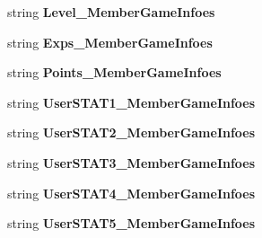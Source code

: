 \begin{DoxyCompactItemize}
\item 
string {\bfseries Level\+\_\+\+Member\+Game\+Infoes}\hypertarget{a00101_a8d192d2682e16ae259cc4486fe7c6ee0}{}\label{a00101_a8d192d2682e16ae259cc4486fe7c6ee0}

\item 
string {\bfseries Exps\+\_\+\+Member\+Game\+Infoes}\hypertarget{a00101_a2fe6ddf92bf865a907417ce0271d56ba}{}\label{a00101_a2fe6ddf92bf865a907417ce0271d56ba}

\item 
string {\bfseries Points\+\_\+\+Member\+Game\+Infoes}\hypertarget{a00101_a616c5e2aa7b237a1312c8d71a88f5f60}{}\label{a00101_a616c5e2aa7b237a1312c8d71a88f5f60}

\item 
string {\bfseries User\+S\+T\+A\+T1\+\_\+\+Member\+Game\+Infoes}\hypertarget{a00101_a1d41a8d2eada36ea6d6b5d16a7959c15}{}\label{a00101_a1d41a8d2eada36ea6d6b5d16a7959c15}

\item 
string {\bfseries User\+S\+T\+A\+T2\+\_\+\+Member\+Game\+Infoes}\hypertarget{a00101_a30b6fd6781f87244f21bc62a7fae27de}{}\label{a00101_a30b6fd6781f87244f21bc62a7fae27de}

\item 
string {\bfseries User\+S\+T\+A\+T3\+\_\+\+Member\+Game\+Infoes}\hypertarget{a00101_a097781efd6c8bee54a6c5ceee0f31cf7}{}\label{a00101_a097781efd6c8bee54a6c5ceee0f31cf7}

\item 
string {\bfseries User\+S\+T\+A\+T4\+\_\+\+Member\+Game\+Infoes}\hypertarget{a00101_aa15f9b9389826d0dba1ed00a36c2c478}{}\label{a00101_aa15f9b9389826d0dba1ed00a36c2c478}

\item 
string {\bfseries User\+S\+T\+A\+T5\+\_\+\+Member\+Game\+Infoes}\hypertarget{a00101_a1df9fbeb4068849bb4c0034bf20d400b}{}\label{a00101_a1df9fbeb4068849bb4c0034bf20d400b}


\end{DoxyCompactItemize}
